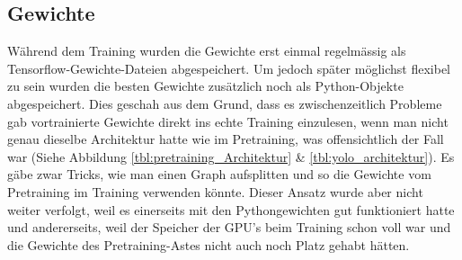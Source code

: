 \subsection{Gewichte}
Während dem Training wurden die Gewichte erst einmal regelmässig als Tensorflow-Gewichte-Dateien abgespeichert.
Um jedoch später möglichst flexibel zu sein wurden die besten Gewichte zusätzlich noch als Python-Objekte abgespeichert.
Dies geschah aus dem Grund, dass es zwischenzeitlich Probleme gab vortrainierte Gewichte direkt ins echte Training einzulesen, wenn man nicht genau dieselbe Architektur hatte wie im Pretraining, was offensichtlich der Fall war (Siehe Abbildung \ref{tbl:pretraining_Architektur} \& \ref{tbl:yolo_architektur}).
Es gäbe zwar Tricks, wie man einen Graph aufsplitten und so die Gewichte vom Pretraining im Training verwenden könnte. 
Dieser Ansatz wurde aber nicht weiter verfolgt, weil es einerseits mit den Pythongewichten gut funktioniert hatte und andererseits, weil der Speicher der GPU's beim Training schon voll war und die Gewichte des Pretraining-Astes nicht auch noch Platz gehabt hätten.

